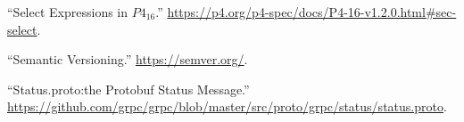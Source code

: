 \documentclass[11pt]{article}
\begin{document}
{{\begin{thebibliography}{38}
\mdbibitemlabel{{}[25]}\textquotedblleft{}Select Expressions in $P4_{16}$.\textquotedblright{} \href{https://p4.org/p4-spec/docs/P4-16-v1.2.0.html\%23sec-select}{{\ttfamily https://\hspace{0pt}p4.\hspace{0pt}org/\hspace{0pt}p4-\hspace{0pt}spec/\hspace{0pt}docs/\hspace{0pt}P4-\hspace{0pt}16-\hspace{0pt}v1.\hspace{0pt}2.\hspace{0pt}0.\hspace{0pt}html\#\hspace{0pt}sec-\hspace{0pt}select}}.\label{p4selectexpr}%

\mdbibitemlabel{{}[26]}\textquotedblleft{}Semantic Versioning.\textquotedblright{} \href{https://semver.org/}{{\ttfamily https://\hspace{0pt}semver.\hspace{0pt}org/\hspace{0pt}}}.\label{semver}%

\mdbibitemlabel{{}[27]}\textquotedblleft{}Status.proto:the Protobuf Status Message.\textquotedblright{} \href{https://github.com/grpc/grpc/blob/master/src/proto/grpc/status/status.proto}{{\ttfamily https://\hspace{0pt}github.\hspace{0pt}com/\hspace{0pt}grpc/\hspace{0pt}grpc/\hspace{0pt}blob/\hspace{0pt}master/\hspace{0pt}src/\hspace{0pt}proto/\hspace{0pt}grpc/\hspace{0pt}status/\hspace{0pt}status.\hspace{0pt}proto}}.\label{protostatus}%


\end{thebibliography}}}
\end{document}
